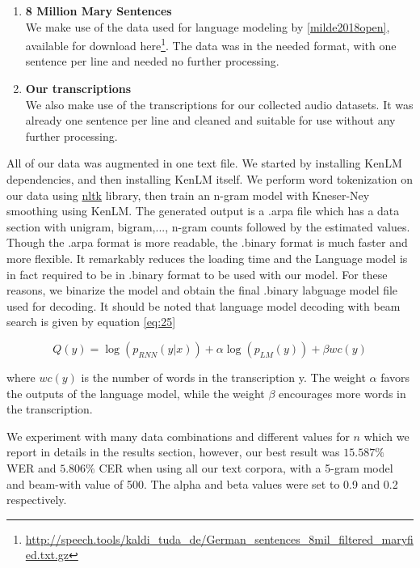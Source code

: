 \begin{enumerate}
	
	\item \textbf{8 Million Mary Sentences} \\
	We make use of the data used for language modeling by \ref{milde2018open}, available for download here\footnote{\url{ http://speech.tools/kaldi_tuda_de/German_sentences_8mil_filtered_maryfied.txt.gz}}. The data was in the needed format, with one sentence per line and needed no further processing.
	
	
	\item \textbf{Our transcriptions} \\
	We also make use of the transcriptions for our collected audio datasets. It was already one sentence per line and cleaned and suitable for use without any further processing.

	
\end{enumerate}

All of our data was augmented in one text file. We started by installing KenLM dependencies, and then installing KenLM itself. We perform word tokenization on our data using \href{https://www.nltk.org/}{nltk} library, then train an n-gram model with Kneser-Ney smoothing using KenLM. The generated output is a .arpa file which has a data section with unigram, bigram,..., n-gram counts followed by the estimated values. Though the .arpa format is more readable, the .binary format is much faster and more flexible. It remarkably reduces the loading time and the Language model is in fact required to be in .binary format to be used with our model. For these reasons, we binarize the model and obtain the final .binary labguage model file used for decoding. It should be noted that language model decoding with beam search is given by equation \ref{eq:25}

\begin{equation}
Q(y) = \log(p_{RNN}(y|x)) + \alpha \log(p_{LM}(y)) + \beta wc(y)
\end{equation}

where $wc(y)$ is the number of words in the transcription y. The weight $\alpha$ favors the outputs of the language model, while the weight $\beta$ encourages more words in the transcription.

We experiment with many data combinations and different values for $n$ which we report in details in the results section, however, our best result was $15.587\%$ \ac{WER} and $5.806\%$ \ac{CER} when using all our text corpora, with a 5-gram model and beam-with value of 500. The alpha and beta values were set to 0.9 and 0.2 respectively.

